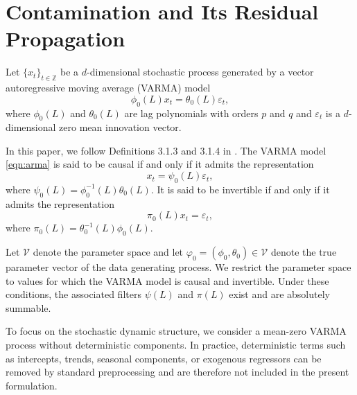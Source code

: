 \documentclass[12pt]{article}
\numberwithin{equation}{section}
\begin{document}
\section{Contamination and Its Residual Propagation} \label{sec:model}

Let $\{x_t\}_{t\in\mathbb Z}$ be a $d$-dimensional stochastic process generated by a vector autoregressive moving average (VARMA) model
\begin{equation} \label{eqn:arma}
\phi_0(L) x_t = \theta_0(L) \varepsilon_t,
\end{equation}
where $\phi_0(L)$ and $\theta_0(L)$ are lag polynomials with orders $p$ and $q$ and $\varepsilon_t$ is a $d$-dimensional zero mean innovation vector.

In this paper, we follow Definitions 3.1.3 and 3.1.4 in \citet{brockwell_time_1991}. 
The VARMA model \eqref{eqn:arma} is said to be causal if and only if it admits the representation
\begin{equation} \label{eqn:inftymv}
x_t = \psi_0(L) \varepsilon_t,
\end{equation}
where $\psi_0(L) = \phi_0^{-1}(L)\theta_0(L)$.
It is said to be invertible if and only if it admits the representation
\begin{equation} \label{eqn:inftyar}
\pi_0(L) x_t = \varepsilon_t,
\end{equation}
where $\pi_0(L) = \theta_0^{-1}(L)\phi_0(L)$.

Let $\mathcal{V}$ denote the parameter space and let $\varphi_0=(\phi_0,\theta_0)\in\mathcal{V}$ denote the true parameter vector of the data generating process.
We restrict the parameter space to values for which the VARMA model is causal and invertible. 
Under these conditions, the associated filters $\psi(L)$ and $\pi(L)$ exist and are absolutely summable.

To focus on the stochastic dynamic structure, we consider a mean-zero VARMA process without deterministic components.
In practice, deterministic terms such as intercepts, trends, seasonal components, or exogenous regressors can be removed by standard preprocessing and are therefore not included in the present formulation.
\end{document}
